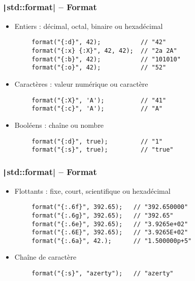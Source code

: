 \documentclass[C++.tex]{subfiles}
\begin{document}
\begin{frame}[fragile]
	\frametitle{\texttt|std::format| -- Format}
	\begin{itemize}
		\item Entiers : décimal, octal, binaire ou hexadécimal
	\end{itemize}

	\begin{verbatim}
		format("{:d}", 42);           // "42"
		format("{:x} {:X}", 42, 42);  // "2a 2A"
		format("{:b}", 42);           // "101010"
		format("{:o}", 42);           // "52"
	\end{verbatim}

	\begin{itemize}
		\item Caractères : valeur numérique ou caractère
	\end{itemize}

	\begin{verbatim}
		format("{:X}", 'A');          // "41"
		format("{:c}", 'A');          // "A"
	\end{verbatim}

	\begin{itemize}
		\item Booléens : chaîne ou nombre
	\end{itemize}

	\begin{verbatim}
		format("{:d}", true);         // "1"
		format("{:s}", true);         // "true"
	\end{verbatim}
\end{frame}

\begin{frame}[fragile]
	\frametitle{\texttt|std::format| -- Format}
	\begin{itemize}
		\item Flottants : fixe, court, scientifique ou hexadécimal
	\end{itemize}

	\begin{verbatim}
		format("{:.6f}", 392.65);   // "392.650000"
		format("{:.6g}", 392.65);   // "392.65"
		format("{:.6e}", 392.65);   // "3.9265e+02"
		format("{:.6E}", 392.65);   // "3.9265E+02"
		format("{:.6a}", 42.);      // "1.500000p+5"
	\end{verbatim}


	\begin{itemize}
		\item Chaîne de caractère
	\end{itemize}

	\begin{verbatim}
		format("{:s}", "azerty");   // "azerty"
	\end{verbatim}
\end{frame}
\end{document}
